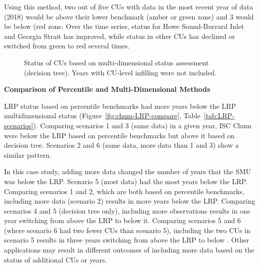 \documentclass[11pt]{book}
\begin{document}
Using this method, two out of five CUs with data in the most recent year of data (2018) would be above their lower benchmark (amber or green zone) and 3 would be below (red zone. Over the time series, status for Howe Sound-Burrard Inlet and Georgia Strait has improved, while status in other CUs has declined or switched from green to red several times.
\begin{figure}[htb]

{\centering {} 

}

\caption{Status of CUs based on multi-dimensional status assessment (decision tree). Years with CU-level infilling were not included.}\label{fig:chum-CU-status-tree}
\end{figure}
\textbf{Comparison of Percentile and Multi-Dimensional Methods}

LRP status based on percentile benchmarks had more years below the LRP multidimensional status (Figure~\ref{fig:chum-LRP-compare}, Table~\ref{tab:LRP-scenarios}). Comparing scenarios 1 and 3 (same data) in a given year, ISC Chum were below the LRP based on percentile benchmarks but above it based on decision tree. Scenarios 2 and 6 (same data, more data than 1 and 3) show a similar pattern.

In this case study, adding more data changed the number of years that the SMU was below the LRP. Scenario 5 (most data) had the most years below the LRP. Comparing scenarios 1 and 2, which are both based on percentile benchmarks, including more data (scenario 2) results in more years below the LRP. Comparing scenarios 4 and 5 (decision tree only), including more observations results in one year switching from above the LRP to below it. Comparing scenarios 5 and 6 (where scenario 6 had two fewer CUs than scenario 5), including the two CUs in scenario 5 results in three years switching from above the LRP to below . Other applications may result in different outcomes of including more data based on the status of additional CUs or years.
\end{document}
